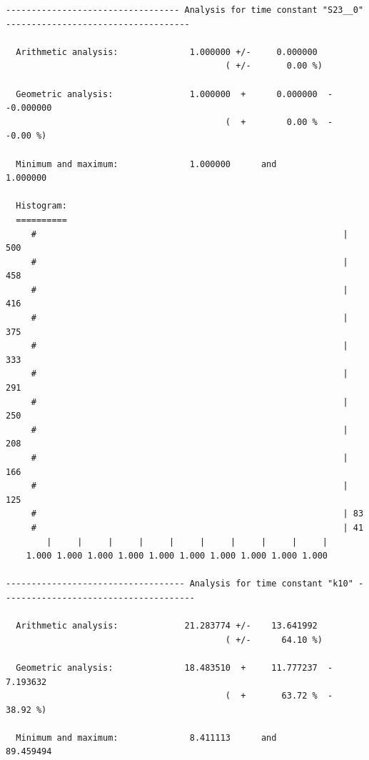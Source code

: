 \documentclass[a4paper,11pt,DIV=15,openany]{scrbook}
\begin{document}
\begin{oframed}
\begin{Verbatim}[commandchars=\\\{\}]
---------------------------------- Analysis for time constant "S23__0" ------------------------------------

  Arithmetic analysis:              1.000000 +/-     0.000000
                                           ( +/-       0.00 %)

  Geometric analysis:               1.000000  +      0.000000  -     -0.000000
                                           (  +        0.00 %  -       -0.00 %)

  Minimum and maximum:              1.000000      and           1.000000

  Histogram:
  ==========
     #                                                            | 500
     #                                                            | 458
     #                                                            | 416
     #                                                            | 375
     #                                                            | 333
     #                                                            | 291
     #                                                            | 250
     #                                                            | 208
     #                                                            | 166
     #                                                            | 125
     #                                                            | 83
     #                                                            | 41
        |     |     |     |     |     |     |     |     |     |  
    1.000 1.000 1.000 1.000 1.000 1.000 1.000 1.000 1.000 1.000

----------------------------------- Analysis for time constant "k10" --------------------------------------

  Arithmetic analysis:             21.283774 +/-    13.641992
                                           ( +/-      64.10 %)

  Geometric analysis:              18.483510  +     11.777237  -      7.193632
                                           (  +       63.72 %  -       38.92 %)

  Minimum and maximum:              8.411113      and          89.459494


\end{Verbatim}
\end{oframed}
\end{document}
